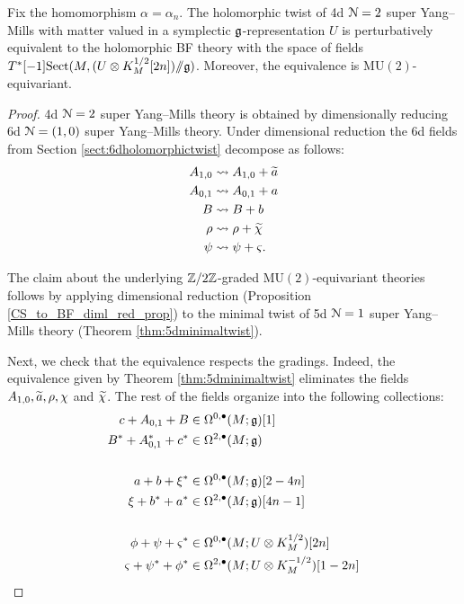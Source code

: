 \documentclass[10pt, oneside]{article}
\newcommand{\MU}{\mathrm{MU}}
\newcommand{\Sect}{\mathrm{Sect}}
\newcommand{\ham}{/\!\!/}
\begin{document}
\begin{theorem}
Fix the homomorphism $\alpha = \alpha_n$. The holomorphic twist of 4d $\cN=2$ super Yang--Mills with matter valued in a symplectic $\fg$-representation $U$ is perturbatively equivalent to the holomorphic BF theory with the space of fields $T^*[-1] \Sect(M, (U\otimes K_M^{1/2}[2n])\ham \fg)$. Moreover, the equivalence is $\MU(2)$-equivariant.
\label{thm:4d2holomorphictwist}
\end{theorem}
\begin{proof}
4d $\cN=2$ super Yang--Mills theory is obtained by dimensionally reducing 6d $\cN=(1,0)$ super Yang--Mills theory. Under dimensional reduction the 6d fields from Section \ref{sect:6dholomorphictwist} decompose as follows:
\begin{align*}
A_{1, 0}&\rightsquigarrow A_{1, 0}+ \Tilde{a} \\
A_{0, 1}&\rightsquigarrow A_{0, 1}+ a \\
B&\rightsquigarrow B+ b \\
\rho&\rightsquigarrow \rho+ \Tilde{\chi} \\
\psi & \rightsquigarrow \psi+ \varsigma . \\
\end{align*}

The claim about the underlying $\ZZ/2\ZZ$-graded $\MU(2)$-equivariant theories follows by applying dimensional reduction (Proposition \ref{CS_to_BF_diml_red_prop}) to the minimal twist of 5d $\cN=1$ super Yang--Mills theory (Theorem \ref{thm:5dminimaltwist}).

Next, we check that the equivalence respects  the gradings. Indeed, the equivalence given by Theorem \ref{thm:5dminimaltwist} eliminates the fields $A_{1, 0}, \Tilde{a}, \rho, \chi$ and $\Tilde{\chi}$. The rest of the fields organize into the following collections:
\begin{align*}
c+A_{0, 1}+B&\in\Omega^{0, \bullet}(M; \fg)[1] \\
B^*+A^*_{0, 1}+ c^*&\in\Omega^{2, \bullet}(M; \fg) \\
\\
a + b + \xi^*&\in\Omega^{0, \bullet}(M; \fg)[2-4n] \\
\xi + b^* + a^*&\in\Omega^{2, \bullet}(M; \fg)[4n-1] \\
\\
\phi + \psi + \varsigma^*&\in\Omega^{0, \bullet}(M; U\otimes K_M^{1/2})[2n] \\
\varsigma + \psi^* + \phi^* &\in\Omega^{2, \bullet}(M; U\otimes K_M^{-1/2})[1-2n]
\end{align*}


\end{proof}
\end{document}
